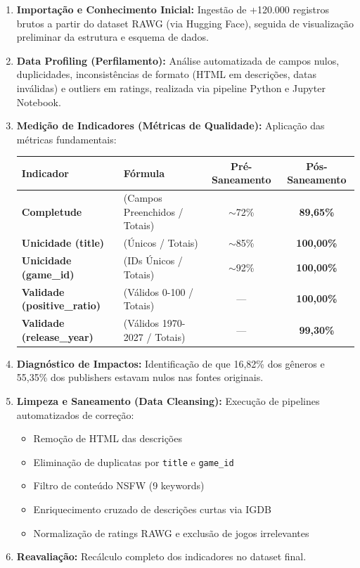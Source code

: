 \documentclass[12pt,a4paper]{article}
\begin{document}
\begin{enumerate}
    \item \textbf{Importação e Conhecimento Inicial:} Ingestão de +120.000 registros brutos a partir do dataset RAWG (via Hugging Face), seguida de visualização preliminar da estrutura e esquema de dados.
    
    \item \textbf{Data Profiling (Perfilamento):} Análise automatizada de campos nulos, duplicidades, inconsistências de formato (HTML em descrições, datas inválidas) e outliers em ratings, realizada via pipeline Python e Jupyter Notebook.
    
    \item \textbf{Medição de Indicadores (Métricas de Qualidade):} Aplicação das métricas fundamentais:
    
    \begin{longtable}{llcc}
    \toprule
    \textbf{Indicador} & \textbf{Fórmula} & \textbf{Pré-Saneamento} & \textbf{Pós-Saneamento} \\
    \midrule
    \endhead
    \textbf{Completude} & (Campos Preenchidos / Totais) & $\sim$72\% & \textbf{89,65\%} \\
    \textbf{Unicidade (title)} & (Únicos / Totais) & $\sim$85\% & \textbf{100,00\%} \\
    \textbf{Unicidade (game\_id)} & (IDs Únicos / Totais) & $\sim$92\% & \textbf{100,00\%} \\
    \textbf{Validade (positive\_ratio)} & (Válidos 0-100 / Totais) & --- & \textbf{100,00\%} \\
    \textbf{Validade (release\_year)} & (Válidos 1970-2027 / Totais) & --- & \textbf{99,30\%} \\
    \bottomrule
    \end{longtable}

    \item \textbf{Diagnóstico de Impactos:} Identificação de que 16,82\% dos gêneros e 55,35\% dos publishers estavam nulos nas fontes originais.
    
    \item \textbf{Limpeza e Saneamento (Data Cleansing):} Execução de pipelines automatizados de correção:
    \begin{itemize}[nosep]
        \item Remoção de HTML das descrições
        \item Eliminação de duplicatas por \texttt{title} e \texttt{game\_id}
        \item Filtro de conteúdo NSFW (9 keywords)
        \item Enriquecimento cruzado de descrições curtas via IGDB
        \item Normalização de ratings RAWG e exclusão de jogos irrelevantes
    \end{itemize}
    
    \item \textbf{Reavaliação:} Recálculo completo dos indicadores no dataset final.
\end{enumerate}
\end{document}
